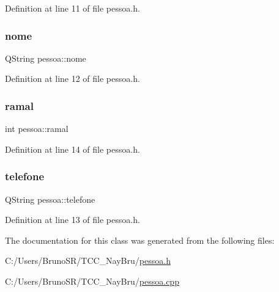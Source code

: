 Definition at line 11 of file pessoa.\+h.

\hypertarget{classpessoa_aa0865641711741f9da9bd6f85a4169a7}{}\label{classpessoa_aa0865641711741f9da9bd6f85a4169a7} 
\subsubsection{\texorpdfstring{nome}{nome}}
{\footnotesize\ttfamily Q\+String pessoa\+::nome}



Definition at line 12 of file pessoa.\+h.

\hypertarget{classpessoa_a3263ed9356bab20fb6c364483fe0d7b7}{}\label{classpessoa_a3263ed9356bab20fb6c364483fe0d7b7} 
\subsubsection{\texorpdfstring{ramal}{ramal}}
{\footnotesize\ttfamily int pessoa\+::ramal}



Definition at line 14 of file pessoa.\+h.

\hypertarget{classpessoa_a68bcc80bb08668da00068cc3e475b771}{}\label{classpessoa_a68bcc80bb08668da00068cc3e475b771} 
\subsubsection{\texorpdfstring{telefone}{telefone}}
{\footnotesize\ttfamily Q\+String pessoa\+::telefone}



Definition at line 13 of file pessoa.\+h.



The documentation for this class was generated from the following files\+:\begin{DoxyCompactItemize}
\item 
C\+:/\+Users/\+Bruno\+S\+R/\+T\+C\+C\+\_\+\+Nay\+Bru/\hyperlink{pessoa_8h}{pessoa.\+h}\item 
C\+:/\+Users/\+Bruno\+S\+R/\+T\+C\+C\+\_\+\+Nay\+Bru/\hyperlink{pessoa_8cpp}{pessoa.\+cpp}\end{DoxyCompactItemize}
